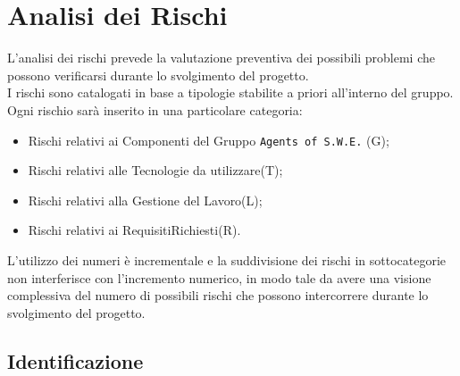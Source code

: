 \section{Analisi dei Rischi}
\label{RischiIntroduzione}

L'analisi dei rischi prevede la valutazione preventiva dei possibili problemi che possono verificarsi durante lo svolgimento del progetto. \\
I rischi sono catalogati in base a tipologie stabilite a priori all'interno del gruppo. 
Ogni rischio sarà inserito in una particolare categoria:
\begin{itemize}
\item Rischi relativi ai Componenti del Gruppo \texttt{Agents of S.W.E.} (G);
\item Rischi relativi alle Tecnologie da utilizzare(T);
\item Rischi relativi alla Gestione del Lavoro(L);
\item Rischi relativi ai Requisiti\glossario Richiesti(R).  
\end{itemize}

L'utilizzo dei numeri è incrementale e la suddivisione dei rischi in sottocategorie non interferisce con l'incremento numerico, in modo tale da avere una visione complessiva del numero di possibili rischi che possono intercorrere durante lo svolgimento del progetto. \\

\subsection{Identificazione}
\label{RischiIdentificazione}

